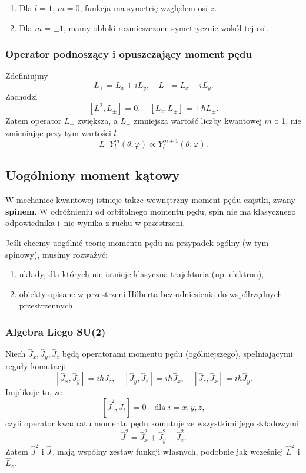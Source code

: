 \begin{enumerate}
\item Dla $l=1$, $m=0$, funkcja ma symetrię względem osi $z$.
\item Dla $m = \pm 1$, mamy obłoki rozmieszczone symetrycznie wokół tej osi.
\end{enumerate}

\subsubsection*{Operator podnoszący i opuszczający moment pędu}
Zdefiniujmy
$$
L_+ = L_x + iL_y, \quad L_- = L_x - iL_y.
$$
Zachodzi
$$
[L^2, L_{\pm}] = 0, \quad [L_z, L_{\pm}] = \pm \hbar L_{\pm}.
$$
Zatem operator $L_+$ zwiększa, a $L_-$ zmniejsza wartość liczby kwantowej $m$ o 1, nie zmieniając przy tym wartości $l$
$$
L_{\pm} Y_l^m(\theta, \varphi) \propto Y_l^{m \pm 1}(\theta, \varphi).
$$

\subsection{Uogólniony moment kątowy}
W mechanice kwantowej istnieje także wewnętrzny moment pędu cząstki, zwany \textbf{spinem}. W odróżnieniu od orbitalnego momentu pędu, spin nie ma klasycznego odpowiednika i~nie wynika z ruchu w przestrzeni.

Jeśli chcemy uogólnić teorię momentu pędu na przypadek ogólny (w tym spinowy), musimy rozważyć:
\begin{enumerate}
\item układy, dla których nie istnieje klasyczna trajektoria (np. elektron),
\item obiekty opisane w przestrzeni Hilberta bez odniesienia do współrzędnych przestrzennych.
\end{enumerate}

\subsubsection*{Algebra Liego SU(2)}
Niech $\hat{J}_x, \hat{J}_y, \hat{J}_z$ będą operatorami momentu pędu (ogólniejszego), spełniającymi reguły komutacji
$$
[\hat{J}_x, \hat{J}_y] = i\hbar \hat{J}_z, \quad [\hat{J}_y, \hat{J}_z] = i\hbar \hat{J}_x, \quad [\hat{J}_z, \hat{J}_x] = i\hbar \hat{J}_y.
$$
Implikuje to, że
$$
[\hat{J}^2, \hat{J}_i] = 0 \quad \text{dla } i = x, y, z,
$$
czyli operator kwadratu momentu pędu komutuje ze wszystkimi jego składowymi
$$
\hat{J}^2 = \hat{J}_x^2 + \hat{J}_y^2 + \hat{J}_z^2.
$$
Zatem $\hat{J}^2$ i $\hat{J}_z$ mają wspólny zestaw funkcji własnych, podobnie jak wcześniej $\hat{L}^2$ i $\hat{L}_z$.

